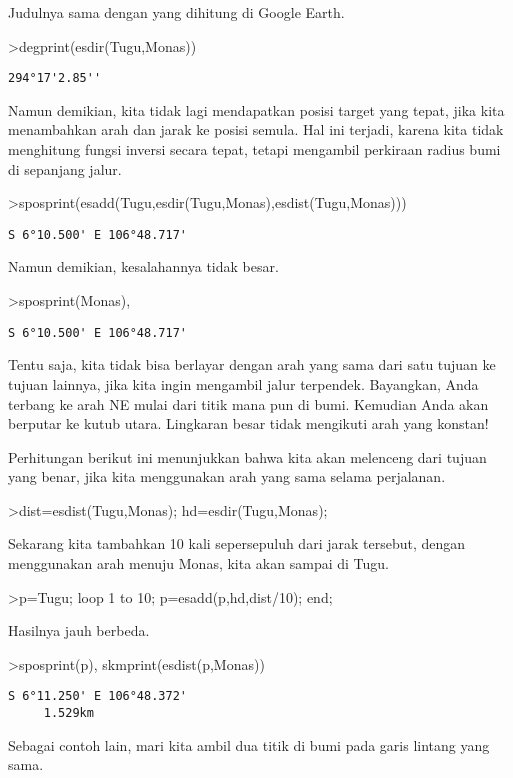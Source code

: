 \documentclass[
]{book}
\begin{document}
Judulnya sama dengan yang dihitung di Google Earth.

\textgreater degprint(esdir(Tugu,Monas))

\begin{verbatim}
294°17'2.85''
\end{verbatim}

Namun demikian, kita tidak lagi mendapatkan posisi target yang tepat, jika kita menambahkan arah dan jarak ke posisi semula. Hal ini terjadi, karena kita tidak menghitung fungsi inversi secara tepat, tetapi mengambil perkiraan radius bumi di sepanjang jalur.

\textgreater sposprint(esadd(Tugu,esdir(Tugu,Monas),esdist(Tugu,Monas)))

\begin{verbatim}
S 6°10.500' E 106°48.717'
\end{verbatim}

Namun demikian, kesalahannya tidak besar.

\textgreater sposprint(Monas),

\begin{verbatim}
S 6°10.500' E 106°48.717'
\end{verbatim}

Tentu saja, kita tidak bisa berlayar dengan arah yang sama dari satu tujuan ke tujuan lainnya, jika kita ingin mengambil jalur terpendek. Bayangkan, Anda terbang ke arah NE mulai dari titik mana pun di bumi. Kemudian Anda akan berputar ke kutub utara. Lingkaran besar tidak mengikuti arah yang konstan!

Perhitungan berikut ini menunjukkan bahwa kita akan melenceng dari tujuan yang benar, jika kita menggunakan arah yang sama selama perjalanan.

\textgreater dist=esdist(Tugu,Monas); hd=esdir(Tugu,Monas);

Sekarang kita tambahkan 10 kali sepersepuluh dari jarak tersebut, dengan menggunakan arah menuju Monas, kita akan sampai di Tugu.

\textgreater p=Tugu; loop 1 to 10; p=esadd(p,hd,dist/10); end;

Hasilnya jauh berbeda.

\textgreater sposprint(p), skmprint(esdist(p,Monas))

\begin{verbatim}
S 6°11.250' E 106°48.372'
     1.529km
\end{verbatim}

Sebagai contoh lain, mari kita ambil dua titik di bumi pada garis lintang yang sama.
\end{document}
